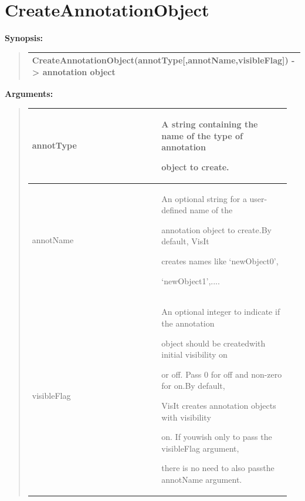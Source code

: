 \documentclass[letterpaper,10pt,english]{sphinxmanual}
\begin{document}
\section{CreateAnnotationObject}
\label{functions:createannotationobject}
\begin{DUlineblock}{0em}
\item[] \textbf{Synopsis:}
\end{DUlineblock}
\begin{quote}

\begin{tabulary}{\linewidth}{|L|}
\hline

CreateAnnotationObject(annotType{[},annotName,visibleFlag{]}) -\textgreater{} annotation object
\\
\hline\end{tabulary}

\end{quote}

\begin{DUlineblock}{0em}
\item[] 
\item[] \textbf{Arguments:}
\end{DUlineblock}
\begin{quote}

\begin{tabular}{|p{0.475\linewidth}|p{0.475\linewidth}|}
\hline

annotType
 & 
\begin{DUlineblock}{0em}
\item[] A string containing the name of the type of annotation
\item[] object to create.
\end{DUlineblock}
\\
\hline
annotName
 & 
\begin{DUlineblock}{0em}
\item[] An optional string for a user-defined name of the
\item[] annotation object to create.By default, VisIt
\item[] creates names like `newObject0',
\item[] `newObject1',....
\end{DUlineblock}
\\
\hline
visibleFlag
 & 
\begin{DUlineblock}{0em}
\item[] An optional integer to indicate if the annotation
\item[] object should be createdwith initial visibility on
\item[] or off. Pass 0 for off and non-zero for on.By default,
\item[] VisIt creates annotation objects with visibility
\item[] on. If youwish only to pass the visibleFlag argument,
\item[] there is no need to also passthe annotName argument.
\end{DUlineblock}
\\
\hline\end{tabular}

\end{quote}
\end{document}
